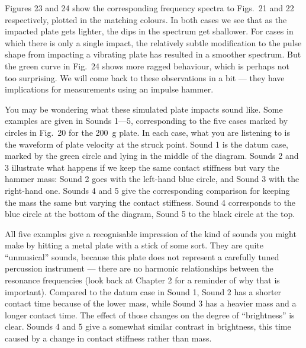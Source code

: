 
  Figures 23 and 24 show the corresponding frequency spectra to Figs.\ 21 and 
  22 respectively, plotted in the matching colours. In both cases we see that 
  as the impacted plate gets lighter, the dips in the spectrum get shallower. 
  For cases in which there is only a single impact, the relatively subtle 
  modification to the pulse shape from impacting a vibrating plate has resulted 
  in a smoother spectrum. But the green curve in Fig.\ 24 shows more ragged 
  behaviour, which is perhaps not too surprising. We will come back to these 
  observations in a bit — they have implications for measurements using an 
  impulse hammer. 



  You may be wondering what these simulated plate impacts sound like. Some 
  examples are given in Sounds 1—5, corresponding to the five cases marked by 
  circles in Fig.\ 20 for the 200~g plate. In each case, what you are listening 
  to is the waveform of plate velocity at the struck point. Sound 1 is the 
  datum case, marked by the green circle and lying in the middle of the 
  diagram. Sounds 2 and 3 illustrate what happens if we keep the same contact 
  stiffness but vary the hammer mass: Sound 2 goes with the left-hand blue 
  circle, and Sound 3 with the right-hand one. Sounds 4 and 5 give the 
  corresponding comparison for keeping the mass the same but varying the 
  contact stiffness. Sound 4 corresponds to the blue circle at the bottom of 
  the diagram, Sound 5 to the black circle at the top. 

  All five examples give a recognisable impression of the kind of sounds you 
  might make by hitting a metal plate with a stick of some sort. They are quite 
  “unmusical” sounds, because this plate does not represent a carefully tuned 
  percussion instrument — there are no harmonic relationships between the 
  resonance frequencies (look back at Chapter 2 for a reminder of why that is 
  important). Compared to the datum case in Sound 1, Sound 2 has a shorter 
  contact time because of the lower mass, while Sound 3 has a heavier mass and 
  a longer contact time. The effect of those changes on the degree of 
  “brightness” is clear. Sounds 4 and 5 give a somewhat similar contrast in 
  brightness, this time caused by a change in contact stiffness rather than 
  mass. 

